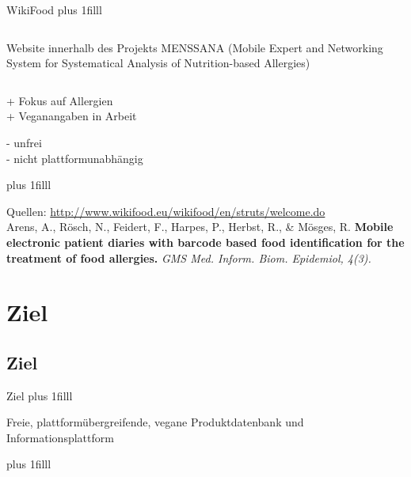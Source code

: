 \documentclass{beamer}
\begin{document}
\begin{frame}{WikiFood}
	\vskip0pt plus 1filll
	\begin{columns}
		{\large Website innerhalb des Projekts MENSSANA (Mobile Expert and Networking System for Systematical
		Analysis of Nutrition-based Allergies)}
			\centering
	\end{columns}

	\begin{exampleblock}{}
		+ Fokus auf Allergien\\
		+ Veganangaben in Arbeit
	\end{exampleblock}
	
	\begin{alertblock}{}
		- unfrei\\
		- nicht plattformunabhängig
	\end{alertblock}

	\vskip0pt plus 1filll
	\par\hrulefill\par
	\tiny{Quellen:
	\url{http://www.wikifood.eu/wikifood/en/struts/welcome.do}}\\
	Arens, A., Rösch, N., Feidert, F., Harpes, P., Herbst, R., \&
	Mösges, R. \textbf{Mobile electronic patient diaries with barcode based
	food identification for the treatment of food allergies.} \textit{GMS Med.
	Inform. Biom. Epidemiol, 4(3).}
\end{frame}

\section{Ziel}
\subsection*{Ziel}
\begin{frame}{Ziel}
	\vskip0pt plus 1filll
	\begin{exampleblock}{}
		Freie, plattformübergreifende, vegane Produktdatenbank und
		Informationsplattform
	\end{exampleblock}
	\vskip0pt plus 1filll
\end{frame}
\end{document}
